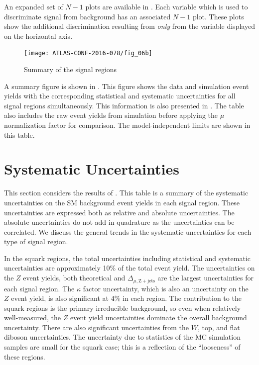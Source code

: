An expanded set of $N-1$ plots are available in .
Each variable which is used to discriminate signal from background has an associated $N-1$ plot.
These plots show the additional discrimination resulting from \textit{only} from the variable displayed on the horizontal axis.

\begin{figure}[tbp]
\centering
\caption{Summary of the signal regions} \label{fig:sr_summary}
\texttt{[image: ATLAS-CONF-2016-078/fig\_06b]}
\end{figure}
A summary figure is shown in .
This figure shows the data and simulation event yields with the corresponding statistical and systematic uncertainties for all signal regions simultaneously.
This information is also presented in .
The table also includes the raw event yields from simulation before applying the $\mu$ normalization factor for comparison.
The model-independent limits are shown in this table.


\section{Systematic Uncertainties}

This section considers the results of .
This table is a summary of the systematic uncertainties on the SM background event yields in each signal region.
These uncertainties are expressed both as relative and absolute uncertainties.
The absolute uncertainties do not add in quadrature as the uncertainties can be correlated.
We discuss the general trends in the systematic uncertainties for each type of signal region.

In the squark regions, the total uncertainties including statistical and systematic uncertainties are approximately 10\% of the total event yield.
The uncertainties on the $Z$ event yields, both theoretical and $\Delta_{\mu,\mathrm{Z+jets}}$ are the largest uncertainties for each signal region.
The $\kappa$ factor uncertainty, which is also an uncertainty on the $Z$ event yield, is also significant at 4\% in each region.
The \Zvv contribution to the squark regions is the primary irreducible background, so even when relatively well-measured, the $Z$ event yield uncertainties dominate the overall background uncertainty.
There are also significant uncertainties from the $W$, top, and flat diboson uncertainties.
The uncertainty due to statistics of the MC simulation samples are small for the squark case; this is a reflection of the ``looseness'' of these regions.

